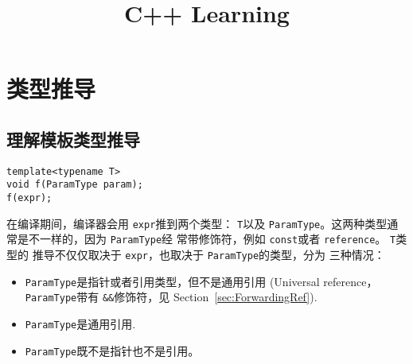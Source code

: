 \message{ !name(../CppLearning.tex)}\documentclass[a4paper,twoside]{article}
\title{C++ Learning}
\theoremstyle{definition}
\theoremstyle{remark}
\numberwithin{equation}{section}
\let\OldTexttt\texttt
\renewcommand{\texttt}[1]{{\color{blue} \OldTexttt{#1}}}
\begin{document}
\newpage

\section{类型推导}

\subsection{理解模板类型推导}
\label{sec:Item2-1}
\begin{verbatim}
template<typename T>
void f(ParamType param);
f(expr);
\end{verbatim}

在编译期间，编译器会用\texttt{expr}推到两个类型：\texttt{T}以及
\texttt{ParamType}。这两种类型通常是不一样的，因为\texttt{ParamType}经
常带修饰符，例如\texttt{const}或者\texttt{reference}。\texttt{T}类型的
推导不仅仅取决于\texttt{expr}，也取决于\texttt{ParamType}的类型，分为
三种情况：
\begin{itemize}
\item \texttt{ParamType}是指针或者引用类型，但不是通用引用
  (Universal reference，\texttt{ParamType}带有\texttt{\&\&}修饰符，见
  Section~\ref{sec:ForwardingRef}).
\item \texttt{ParamType}是通用引用.
\item \texttt{ParamType}既不是指针也不是引用。
\end{itemize}
\end{document}
